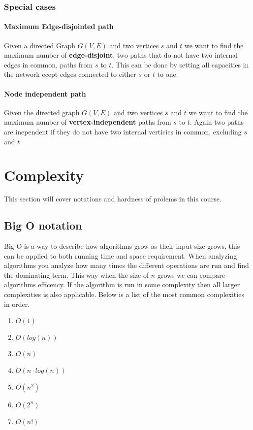 \documentclass[12pt]{article} %
\begin{document}
\subsubsection{Special cases}

\paragraph{Maximum Edge-disjointed path}
Given a directed Graph $G(V, E)$ and two vertices $s$ and $t$ we want to find the maximum number of \textbf{edge-disjoint}, two paths that do not have two internal edges in common, paths from $s$ to $t$. This can be done by setting all capacities in the network ecept edges connected to either $s$ or $t$ to one.

\paragraph{Node independent path}
Given the directed graph $G(V, E)$ and two vertices $s$ and $t$ we want to find the maximum number of \textbf{vertex-independent} paths from $s$ to $t$. Again two paths are inependent if they do not have two internal verticies in common, excluding $s$ and $t$

\section{Complexity}
This section will cover notations and hardness of prolems in this course.

\subsection{Big O notation}
Big O is a way to describe how algorithms grow as their input size grows, this can be applied to both running time and space requirement. When analyzing algorithms you analyze how many times the different operations are run and find the dominating term. This way when the size of $n$ grows we can compare algorithms efficency. If the algorithm is run in some complexity then all larger complexities is also applicable. Below is a list of the most common complexities in order.

\begin{enumerate}
    \item $O(1)$
    \item $O(log(n))$
    \item $O(n)$
    \item $O(n \cdot log(n))$
    \item $O(n^2)$
    \item $O(2^n)$
    \item $O(n!)$
\end{enumerate}
\end{document}
